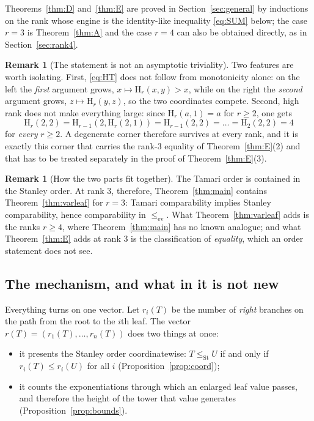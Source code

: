 \documentclass[11pt,a4paper]{article}
\theoremstyle{plain}
\theoremstyle{definition}
\newtheorem{remark}[theorem]{Remark}
\newcommand{\HH}{\mathrm{H}}
\newcommand{\ev}{\mathrm{ev}}
\newcommand{\St}{\mathrm{St}}
\begin{document}
Theorems~\ref{thm:D} and~\ref{thm:E} are proved in Section~\ref{sec:general} by
inductions on the rank whose engine is the identity-like inequality \eqref{eq:SUM}
below; the case $r=3$ is Theorem~\ref{thm:A} and the case $r=4$ can also be
obtained directly, as in Section~\ref{sec:rank4}.

\begin{remark}[The statement is not an asymptotic triviality]\label{rem:nontriv}
Two features are worth isolating. First, \eqref{eq:HT} does not follow from
monotonicity alone: on the left the \emph{first} argument grows,
$x\mapsto\HH_r(x,y)>x$, while on the right the \emph{second} argument grows,
$z\mapsto\HH_r(y,z)$, so the two coordinates compete. Second, high rank does not
make everything large: since $\HH_r(a,1)=a$ for $r\ge2$, one gets
\[
  \HH_r(2,2)=\HH_{r-1}(2,\HH_r(2,1))=\HH_{r-1}(2,2)=\dots=\HH_2(2,2)=4
\]
for \emph{every} $r\ge2$. A degenerate corner therefore survives at every rank, and
it is exactly this corner that carries the rank-$3$ equality of
Theorem~\ref{thm:E}(2) and that has to be treated separately in the proof of
Theorem~\ref{thm:E}(3).
\end{remark}

\begin{remark}[How the two parts fit together]\label{rem:fit}
The Tamari order is contained in the Stanley order. At rank $3$, therefore,
Theorem~\ref{thm:main} contains Theorem~\ref{thm:varleaf} for $r=3$: Tamari
comparability implies Stanley comparability, hence comparability in $\le_{\ev}$. What
Theorem~\ref{thm:varleaf} adds is the ranks $r\ge4$, where Theorem~\ref{thm:main} has no
known analogue; and what Theorem~\ref{thm:E} adds at rank $3$ is the classification of
\emph{equality}, which an order statement does not see.
\end{remark}
\subsection{The mechanism, and what in it is not new}

Everything turns on one vector. Let $r_i(T)$ be the number of \emph{right} branches on
the path from the root to the $i$th leaf. The vector $r(T)=(r_1(T),\dots,r_n(T))$ does
two things at once:

\begin{itemize}
\item it presents the Stanley order coordinatewise: $T\le_{\St}U$ if and only if
      $r_i(T)\le r_i(U)$ for all $i$ (Proposition~\ref{prop:coord});
\item it counts the exponentiations through which an enlarged leaf value passes, and
      therefore the height of the tower that value generates
      (Proposition~\ref{prop:bounds}).
\end{itemize}
\end{document}
